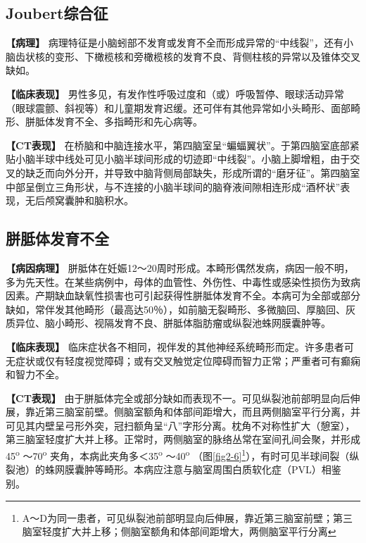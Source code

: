 \subsection{Joubert综合征}

\textbf{【病理】}
病理特征是小脑蚓部不发育或发育不全而形成异常的“中线裂”，还有小脑齿状核的变形、下橄榄核和旁橄榄核的发育不良、背侧柱核的异常以及锥体交叉缺如。

\textbf{【临床表现】}
男性多见，有发作性呼吸过度和（或）呼吸暂停、眼球活动异常（眼球震颤、斜视等）和儿童期发育迟缓。还可伴有其他异常如小头畸形、面部畸形、胼胝体发育不全、多指畸形和先心病等。

\textbf{【CT表现】}
在桥脑和中脑连接水平，第四脑室呈“蝙蝠翼状”。于第四脑室底部紧贴小脑半球中线处可见小脑半球间形成的切迹即“中线裂”。小脑上脚增粗，由于交叉的缺乏而向外分开，并导致中脑背侧局部缺失，形成所谓的“磨牙征”。第四脑室中部呈倒立三角形状，与不连接的小脑半球间的脑脊液间隙相连形成“酒杯状”表现，无后颅窝囊肿和脑积水。

\subsection{胼胝体发育不全}

\textbf{【病因病理】}
胼胝体在妊娠12～20周时形成。本畸形偶然发病，病因一般不明，多为先天性。在某些病例中，母体的血管性、外伤性、中毒性或感染性损伤为致病因素。产期缺血缺氧性损害也可引起获得性胼胝体发育不全。本病可为全部或部分缺如，常伴发其他畸形（最高达50％），如前脑无裂畸形、多微脑回、厚脑回、灰质异位、脑小畸形、视隔发育不良、胼胝体脂肪瘤或纵裂池蛛网膜囊肿等。

\textbf{【临床表现】}
临床症状各不相同，视伴发的其他神经系统畸形而定。许多患者可无症状或仅有轻度视觉障碍；或有交叉触觉定位障碍而智力正常；严重者可有癫痫和智力不全。

\textbf{【CT表现】}
由于胼胝体完全或部分缺如而表现不一。可见纵裂池前部明显向后伸展，靠近第三脑室前壁。侧脑室额角和体部间距增大，而且两侧脑室平行分离，并可见其内壁呈弓形外突，冠扫额角呈“八”字形分离。枕角不对称性扩大（憩室），第三脑室轻度扩大并上移。正常时，两侧脑室的脉络丛常在室间孔间会聚，并形成45\textsuperscript{o}
～70\textsuperscript{o} 夹角，本病此夹角多＜35\textsuperscript{o}
～40\textsuperscript{o}
（图\ref{fig2-6}\footnote{A～D为同一患者，可见纵裂池前部明显向后伸展，靠近第三脑室前壁；第三脑室轻度扩大并上移；侧脑室额角和体部间距增大，两侧脑室平行分离}），有时可见半球间裂（纵裂池）的蛛网膜囊肿等畸形。本病应注意与脑室周围白质软化症（PVL）相鉴别。



